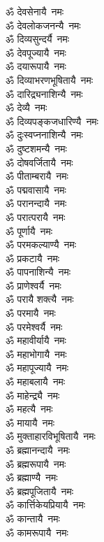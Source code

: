 \begin{flushleft}
\begin{multicols}{2}
ॐ देवसेनायै~नमः\\
ॐ देवलोकजनन्यै~नमः\\
ॐ दिव्यसुन्दर्यै~नमः\\
ॐ देवपूज्यायै~नमः\\
ॐ दयारूपायै~नमः\\
ॐ दिव्याभरणभूषितायै~नमः\\
ॐ दारिद्र्यनाशिन्यै~नमः\\
ॐ देव्यै~नमः\\
ॐ दिव्यपङ्कजधारिण्यै~नमः\\
ॐ दुःस्वप्ननाशिन्यै~नमः\hfill{}\\
ॐ दुष्टशमन्यै~नमः\\
ॐ दोषवर्जितायै~नमः\\
ॐ पीताम्बरायै~नमः\\
ॐ पद्मवासायै~नमः\\
ॐ परानन्दायै~नमः\\
ॐ परात्परायै~नमः\\
ॐ पूर्णायै~नमः\\
ॐ परमकल्याण्यै~नमः\\
ॐ प्रकटायै~नमः\\
ॐ पापनाशिन्यै~नमः\hfill{}\\
ॐ प्राणेश्वर्यै~नमः\\
ॐ परायै शक्त्यै~नमः\\
ॐ परमायै~नमः\\
ॐ परमेश्वर्यै~नमः\\
ॐ महावीर्यायै~नमः\\
ॐ महाभोगायै~नमः\\
ॐ महापूज्यायै~नमः\\
ॐ महाबलायै~नमः\\
ॐ माहेन्द्र्यै~नमः\\
ॐ महत्यै~नमः\hfill{}\\
ॐ मायायै~नमः\\
ॐ मुक्ताहारविभूषितायै~नमः\\
ॐ ब्रह्मानन्दायै~नमः\\
ॐ ब्रह्मरूपायै~नमः\\
ॐ ब्रह्माण्यै~नमः\\
ॐ ब्रह्मपूजितायै~नमः\\
ॐ कार्त्तिकेयप्रियायै~नमः\\
ॐ कान्तायै~नमः\\
ॐ कामरूपायै~नमः\\

\end{multicols}
\end{flushleft}

